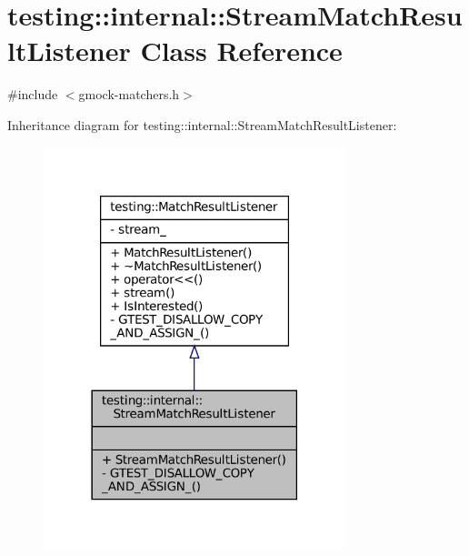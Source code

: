\hypertarget{classtesting_1_1internal_1_1StreamMatchResultListener}{}\section{testing\+:\+:internal\+:\+:Stream\+Match\+Result\+Listener Class Reference}
\label{classtesting_1_1internal_1_1StreamMatchResultListener}


{\ttfamily \#include $<$gmock-\/matchers.\+h$>$}



Inheritance diagram for testing\+:\+:internal\+:\+:Stream\+Match\+Result\+Listener\+:
\nopagebreak
\begin{figure}[H]
\begin{center}
\leavevmode
\includegraphics[width=249pt]{classtesting_1_1internal_1_1StreamMatchResultListener__inherit__graph}
\end{center}
\end{figure}


